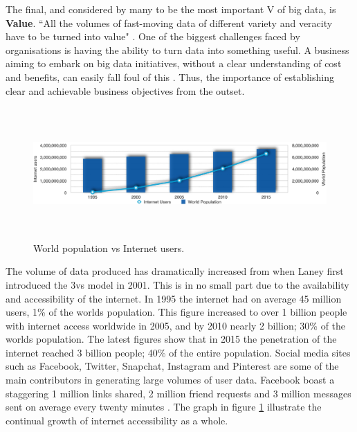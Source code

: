 The final, and considered by many to be the most important V of big data, is \textbf{Value}. ``All the volumes of fast-moving data of different variety and veracity have to be turned into value" \cite{ibm}. One of the biggest challenges faced by organisations is having the ability to turn data into something useful. A business aiming to embark on big data initiatives, without a clear understanding of cost and benefits, can easily fall foul of this \cite{bigdata}. Thus, the importance of establishing clear and achievable business objectives from the outset.

\begin{figure}[h]\begin{center}\includegraphics[height=5cm,width=1\linewidth]{images/worldpopgraph}\caption{World population vs Internet users.}\label{fig:worldpop}\end{center}\end{figure}

The volume of data produced has dramatically increased from when Laney first introduced the 3vs model in 2001. This is in no small part due to the availability and accessibility of the internet. In 1995 the internet had on average 45 million users, 1\% of the worlds population. This figure increased to over 1 billion people with internet access worldwide in 2005, and by 2010 nearly 2 billion; 30\% of the worlds population. The latest figures show that in 2015 the penetration of the internet reached 3 billion people; 40\% of the entire population. Social media sites such as Facebook, Twitter, Snapchat, Instagram and Pinterest are some of the main contributors in generating large volumes of user data. Facebook boast a staggering 1 million links shared, 2 million friend requests and 3 million messages sent on average every twenty minutes \cite{statref}. The graph in figure \ref{fig:worldpop} illustrate the continual growth of internet accessibility as a whole.


